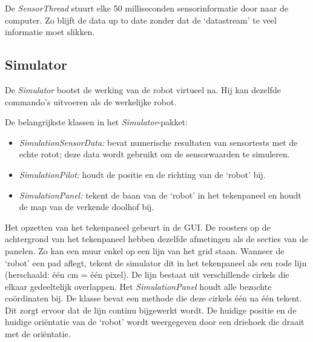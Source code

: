 \documentclass[tt3]{penoverslag}
\begin{document}
De \textit{SensorThread} stuurt elke 50 milliseconden sensorinformatie door naar de computer. Zo blijft de data up to date zonder dat de `datastream' te veel informatie moet slikken.

\subsection{Simulator} %
\label{ssec:simulator}
De \textit{Simulator} bootst de werking van de robot virtueel na. Hij kan dezelfde commando's uitvoeren als de werkelijke robot.

De belangrijkste klassen in het \textit{Simulator}-pakket:

\begin{itemize}
\item \textit{SimulationSensorData:} bevat numerische resultaten van sensortests met de echte rotot; deze data wordt gebruikt om de sensorwaarden te simuleren.
\item \textit{SimulationPilot:} houdt de positie en de richting van de `robot' bij.
\item \textit{SimulationPanel:} tekent de baan van de `robot' in het tekenpaneel en houdt de map van de verkende doolhof bij.
\end{itemize}

Het opzetten van het tekenpaneel gebeurt in de GUI. De roosters op de achtergrond van het tekenpaneel hebben dezelfde afmetingen als de secties van de panelen. Zo kan een muur enkel op een lijn van het grid staan.
Wanneer de `robot' een pad aflegt, tekent de simulator dit in het tekenpaneel als een rode lijn (herschaald: \'e\'en cm = \'e\'en pixel). De lijn  bestaat uit verschillende cirkels die elkaar gedeeltelijk overlappen. Het \textit{SimulationPanel} houdt alle bezochte co\"ordinaten bij. De klasse bevat een methode die deze cirkels \'e\'en na \'e\'en tekent. Dit zorgt ervoor dat de lijn continu bijgewerkt wordt. De huidige positie en de huidige ori\"entatie van de `robot' wordt weergegeven door een driehoek die draait met de ori\"entatie.

\end{document}
